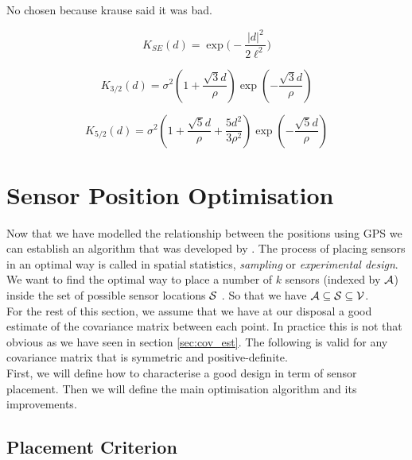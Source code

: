No chosen because krause said it was bad. 


\begin{equation}
	 K_{SE}(d) = \exp \Big(-\frac{|d|^2}{2\ell^2} \Big)
\end{equation}

\begin{equation}
	K_{3/2}(d) = \sigma^2\left(1+\frac{\sqrt{3}d}{\rho}\right)\exp\left(-\frac{\sqrt{3}d}{\rho}\right)
\end{equation} 
 
\begin{equation}
	K_{5/2}(d) = \sigma^2\left(1+\frac{\sqrt{5}d}{\rho}+\frac{5d^2}{3\rho^2}\right)\exp\left(-\frac{\sqrt{5}d}{\rho}\right)
\end{equation}

\section{Sensor Position Optimisation}\label{sec:theory:opt}

Now that we have modelled the relationship between the positions using GPS we can establish an algorithm that was developed by \citet{krause_near-optimal_2008}. The process of placing sensors in an optimal way is called in spatial statistics, \textit{sampling} or \textit{experimental design}. We want to find the optimal way to place a number of $k$ sensors (indexed by $\A$) inside the set of possible sensor locations $\S$ . So that we have $\A \subseteq \S \subseteq \V$. \\


For the rest of this section, we assume that we have at our disposal a good estimate of the covariance matrix between each point. In practice this is not that obvious as we have seen in section \ref{sec:cov_est}. The following is valid for any covariance matrix that is symmetric and positive-definite. \\ 

First, we will define how to characterise a good design in term of sensor placement. Then we will define the main optimisation algorithm and its improvements. \\ 

\subsection{Placement Criterion}

